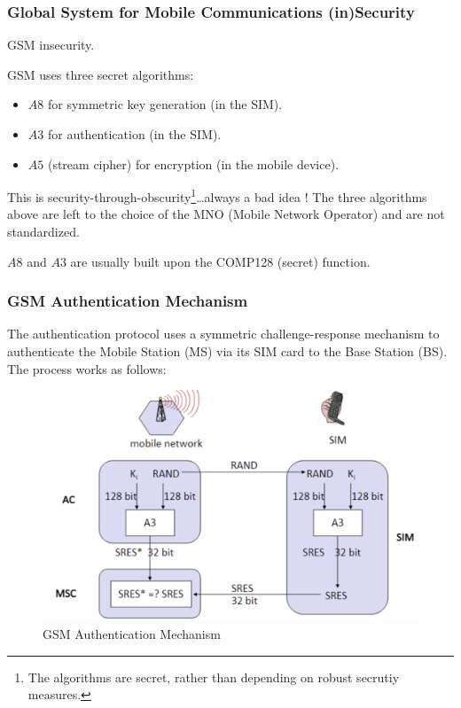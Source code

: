 \subsubsection{Global System for Mobile Communications (in)Security}
\begin{center}
    GSM insecurity.
\end{center}
GSM uses three secret algorithms:
\begin{itemize}
    \item $A8$ for symmetric key generation (in the SIM).
    \item $A3$ for authentication (in the SIM).
    \item $A5$ (stream cipher) for encryption (in the mobile device).
\end{itemize}
This is security-through-obscurity\footnote{The algorithms are secret, rather than depending on robust secrutiy measures.}\dots always a bad idea !
The three algorithms above are left to the choice of the MNO (Mobile Network Operator) and are not standardized.
\begin{tcolorbox}[colback=blue!10!white, colframe=blue!50!white]
$A8$ and $A3$ are usually built upon the COMP128 (secret) function.
\end{tcolorbox}

\clearpage
\subsubsection*{GSM Authentication Mechanism}
\begin{multicols}{2}

    The authentication protocol uses a symmetric challenge-response mechanism to authenticate the Mobile Station (MS) via its SIM card to the Base Station (BS). The process works as follows:
\columnbreak

    \begin{figure}[H]
        \centering
        \includegraphics[width=\linewidth]{Images/Authentication/gsm_authn.png}
        \caption{GSM Authentication Mechanism}
    \end{figure}
\end{multicols}

